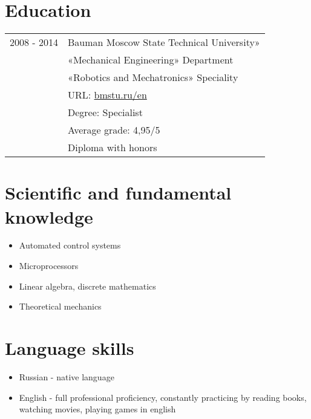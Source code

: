 \documentclass[a4paper, 11pt]{article}
\begin{document}
\section{Education}
\begin{tabular}{p{25mm}|p{110mm}}
2008 - 2014         & Bauman Moscow State Technical University»         \\
                    & «Mechanical Engineering» Department               \\
                    & «Robotics and Mechatronics» Speciality            \\
                    & URL: \href{http://www.bmstu.ru/en/}{bmstu.ru/en}  \\
                    & Degree: Specialist                                \\
                    & Average grade: 4,95/5                             \\
                    & Diploma with honors
\end{tabular}

\section{Scientific and fundamental knowledge}
\begin{itemize}
    \item Automated control systems
    \item Microprocessors
    \item Linear algebra, discrete mathematics
    \item Theoretical mechanics
\end{itemize}

\section{Language skills}
\begin{itemize}
    \item   Russian    - native language
    \item   English    - full professional proficiency, constantly practicing by
            reading books, watching movies, playing games in english
\end{itemize}
\end{document}

